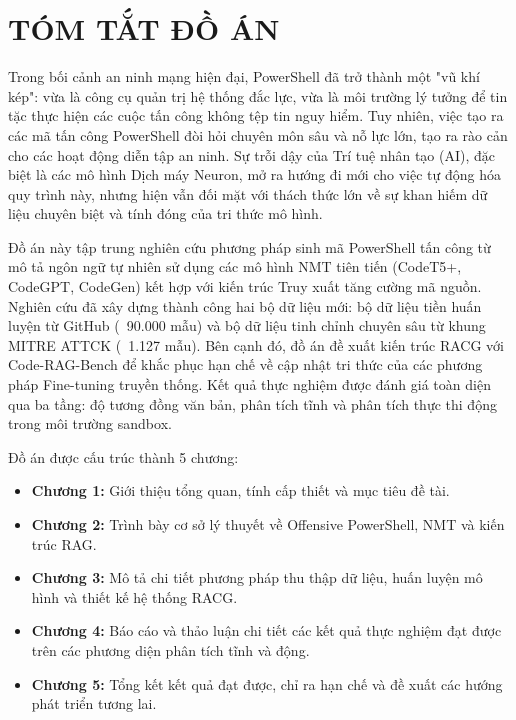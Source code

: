 \chapter*{TÓM TẮT ĐỒ ÁN}

Trong bối cảnh an ninh mạng hiện đại, PowerShell đã trở thành một "vũ khí kép": vừa là công cụ quản trị hệ thống đắc lực, vừa là môi trường lý tưởng để tin tặc thực hiện các cuộc tấn công không tệp tin nguy hiểm. Tuy nhiên, việc tạo ra các mã tấn công PowerShell đòi hỏi chuyên môn sâu và nỗ lực lớn, tạo ra rào cản cho các hoạt động diễn tập an ninh. Sự trỗi dậy của Trí tuệ nhân tạo (AI), đặc biệt là các mô hình Dịch máy Neuron, mở ra hướng đi mới cho việc tự động hóa quy trình này, nhưng hiện vẫn đối mặt với thách thức lớn về sự khan hiếm dữ liệu chuyên biệt và tính đóng của tri thức mô hình.

Đồ án này tập trung nghiên cứu phương pháp sinh mã PowerShell tấn công từ mô tả ngôn ngữ tự nhiên sử dụng các mô hình NMT tiên tiến (CodeT5+, CodeGPT, CodeGen) kết hợp với kiến trúc Truy xuất tăng cường mã nguồn. Nghiên cứu đã xây dựng thành công hai bộ dữ liệu mới: bộ dữ liệu tiền huấn luyện từ GitHub (~90.000 mẫu) và bộ dữ liệu tinh chỉnh chuyên sâu từ khung MITRE ATTCK (~1.127 mẫu). Bên cạnh đó, đồ án đề xuất kiến trúc RACG với Code-RAG-Bench để khắc phục hạn chế về cập nhật tri thức của các phương pháp Fine-tuning truyền thống. Kết quả thực nghiệm được đánh giá toàn diện qua ba tầng: độ tương đồng văn bản, phân tích tĩnh và phân tích thực thi động trong môi trường sandbox.

\bigbreak\noindent
Đồ án được cấu trúc thành 5 chương: 
\begin{itemize}
    \item \textbf{Chương 1:} Giới thiệu tổng quan, tính cấp thiết và mục tiêu đề tài.
    \item \textbf{Chương 2:} Trình bày cơ sở lý thuyết về Offensive PowerShell, NMT và kiến trúc RAG.
    \item \textbf{Chương 3:} Mô tả chi tiết phương pháp thu thập dữ liệu, huấn luyện mô hình và thiết kế hệ thống RACG.
    \item \textbf{Chương 4:} Báo cáo và thảo luận chi tiết các kết quả thực nghiệm đạt được trên các phương diện phân tích tĩnh và động.
    \item \textbf{Chương 5:} Tổng kết kết quả đạt được, chỉ ra hạn chế và đề xuất các hướng phát triển tương lai.
\end{itemize}